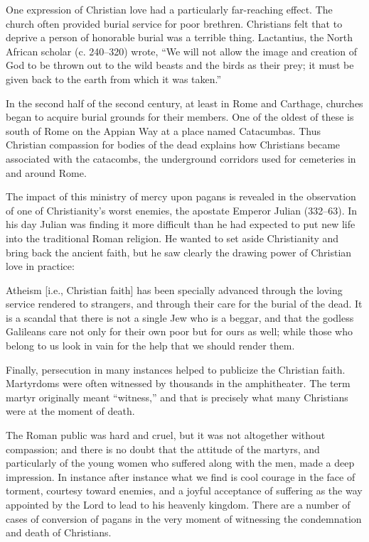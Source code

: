 One expression of Christian love had a particularly far-reaching effect. The church often provided
burial service for poor brethren. Christians felt that to deprive a person of honorable burial was a
terrible thing. Lactantius, the North African scholar (c. 240–320) wrote, “We will not allow the
image and creation of God to be thrown out to the wild beasts and the birds as their prey; it must
be given back to the earth from which it was taken.”

In the second half of the second century, at least in Rome and Carthage, churches began to acquire
burial grounds for their members. One of the oldest of these is south of Rome on the Appian Way at a
place named Catacumbas. Thus Christian compassion for bodies of the dead explains how Christians
became associated with the catacombs, the underground corridors used for cemeteries in and around
Rome.

The impact of this ministry of mercy upon pagans is revealed in the observation of one of
Christianity’s worst enemies, the apostate Emperor Julian (332–63). In his day Julian was finding it
more difficult than he had expected to put new life into the traditional Roman religion. He wanted
to set aside Christianity and bring back the ancient faith, but he saw clearly the drawing power of
Christian love in practice:

\begin{blockquote}
Atheism [i.e., Christian faith] has been specially advanced through the loving service rendered to
strangers, and through their care for the burial of the dead. It is a scandal that there is not a
single Jew who is a beggar, and that the godless Galileans care not only for their own poor but for
ours as well; while those who belong to us look in vain for the help that we should render them.
\end{blockquote}

Finally, persecution in many instances helped to publicize the Christian faith. Martyrdoms were
often witnessed by thousands in the amphitheater. The term martyr originally meant “witness,” and
that is precisely what many Christians were at the moment of death.

The Roman public was hard and cruel, but it was not altogether without compassion; and there is no
doubt that the attitude of the martyrs, and particularly of the young women who suffered along with
the men, made a deep impression. In instance after instance what we find is cool courage in the face
of torment, courtesy toward enemies, and a joyful acceptance of suffering as the way appointed by
the Lord to lead to his heavenly kingdom. There are a number of cases of conversion of pagans in the
very moment of witnessing the condemnation and death of Christians.

